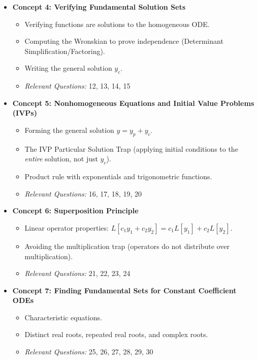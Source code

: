 \documentclass[12pt]{article}
\begin{document}
\begin{itemize}
    \item \textbf{Concept 4: Verifying Fundamental Solution Sets}
    \begin{itemize}
        \item Verifying functions are solutions to the homogeneous ODE.
        \item Computing the Wronskian to prove independence (Determinant Simplification/Factoring).
        \item Writing the general solution $y_c$.
        \item \textit{Relevant Questions:} 12, 13, 14, 15
    \end{itemize}

    \item \textbf{Concept 5: Nonhomogeneous Equations and Initial Value Problems (IVPs)}
    \begin{itemize}
        \item Forming the general solution $y = y_p + y_c$.
        \item The IVP Particular Solution Trap (applying initial conditions to the \textit{entire} solution, not just $y_c$).
        \item Product rule with exponentials and trigonometric functions.
        \item \textit{Relevant Questions:} 16, 17, 18, 19, 20
    \end{itemize}

    \item \textbf{Concept 6: Superposition Principle}
    \begin{itemize}
        \item Linear operator properties: $L[c_1y_1 + c_2y_2] = c_1L[y_1] + c_2L[y_2]$.
        \item Avoiding the multiplication trap (operators do not distribute over multiplication).
        \item \textit{Relevant Questions:} 21, 22, 23, 24
    \end{itemize}

    \item \textbf{Concept 7: Finding Fundamental Sets for Constant Coefficient ODEs}
    \begin{itemize}
        \item Characteristic equations.
        \item Distinct real roots, repeated real roots, and complex roots.
        \item \textit{Relevant Questions:} 25, 26, 27, 28, 29, 30
    \end{itemize}
\end{itemize}
\end{document}
